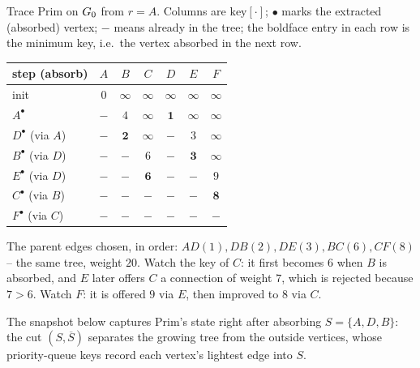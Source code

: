 \begin{labbox}
Trace Prim on $G_0$ from $r=A$. Columns are $\mathrm{key}[\cdot]$; $\bullet$ marks the extracted (absorbed) vertex; $-$ means already in the tree; the boldface entry in each row is the minimum key, i.e.\ the vertex absorbed in the next row.

\begin{center}
\begin{tabular}{lcccccc}
\toprule
step (absorb) & $A$ & $B$ & $C$ & $D$ & $E$ & $F$ \\
\midrule
init                & $0$ & $\infty$ & $\infty$ & $\infty$ & $\infty$ & $\infty$ \\
$A^\bullet$         & $-$ & $4$ & $\infty$ & $\mathbf 1$ & $\infty$ & $\infty$ \\
$D^\bullet$ (via $A$)& $-$ & $\mathbf 2$ & $\infty$ & $-$ & $3$ & $\infty$ \\
$B^\bullet$ (via $D$)& $-$ & $-$ & $6$ & $-$ & $\mathbf 3$ & $\infty$ \\
$E^\bullet$ (via $D$)& $-$ & $-$ & $\mathbf 6$ & $-$ & $-$ & $9$ \\
$C^\bullet$ (via $B$)& $-$ & $-$ & $-$ & $-$ & $-$ & $\mathbf 8$ \\
$F^\bullet$ (via $C$)& $-$ & $-$ & $-$ & $-$ & $-$ & $-$ \\
\bottomrule
\end{tabular}
\end{center}

The parent edges chosen, in order: $AD(1),DB(2),DE(3),BC(6),CF(8)$ -- the same tree, weight $20$. Watch the key of $C$: it first becomes $6$ when $B$ is absorbed, and $E$ later offers $C$ a connection of weight $7$, which is rejected because $7>6$. Watch $F$: it is offered $9$ via $E$, then improved to $8$ via $C$.
\end{labbox}

The snapshot below captures Prim's state right after absorbing $S=\{A,D,B\}$: the cut $(S,\overline S)$ separates the growing tree from the outside vertices, whose priority-queue keys record each vertex's lightest edge into $S$.

